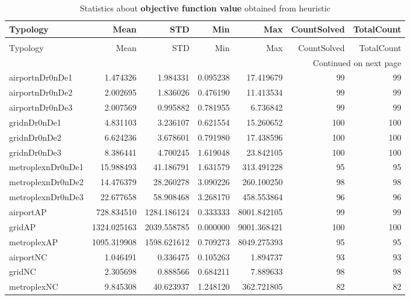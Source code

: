 
\begin{longtable}{|l|r|r|r|r|r|r|}
\caption{Statistics about \textbf{objective function value} obtained from heuristic} \label{table:heuristic:results} \\ \hline

Typology & Mean & STD & Min & Max & CountSolved & TotalCount \\ \hline

\endfirsthead
\caption[]{Statistics about \textbf{objective function value} obtained from heuristic} \\ \hline

Typology & Mean & STD & Min & Max & CountSolved & TotalCount \\ \hline

\endhead

\multicolumn{7}{r}{Continued on next page} \\ \hline

\endfoot

\endlastfoot
airportnDr0nDe1 & 1.474326 & 1.984331 & 0.095238 & 17.419679 & 99 & 99 \\ \hline
airportnDr0nDe2 & 2.002695 & 1.836026 & 0.476190 & 11.413534 & 99 & 99 \\ \hline
airportnDr0nDe3 & 2.007569 & 0.995882 & 0.781955 & 6.736842 & 99 & 99 \\ \hline
gridnDr0nDe1 & 4.831103 & 3.236107 & 0.621554 & 15.260652 & 100 & 100 \\ \hline
gridnDr0nDe2 & 6.624236 & 3.678601 & 0.791980 & 17.438596 & 100 & 100 \\ \hline
gridnDr0nDe3 & 8.386441 & 4.700245 & 1.619048 & 23.842105 & 100 & 100 \\ \hline
metroplexnDr0nDe1 & 15.988493 & 41.186791 & 1.631579 & 313.491228 & 95 & 95 \\ \hline
metroplexnDr0nDe2 & 14.476379 & 28.260278 & 3.090226 & 260.100250 & 98 & 98 \\ \hline
metroplexnDr0nDe3 & 22.677658 & 58.908468 & 3.268170 & 458.553864 & 96 & 96 \\ \hline
airportAP & 728.834510 & 1284.186124 & 0.333333 & 8001.842105 & 99 & 99 \\ \hline
gridAP & 1324.025163 & 2039.558785 & 0.000000 & 9001.368421 & 100 & 100 \\ \hline
metroplexAP & 1095.319908 & 1598.621612 & 0.709273 & 8049.275393 & 95 & 95 \\ \hline
airportNC & 1.046491 & 0.336475 & 0.105263 & 1.894737 & 93 & 93 \\ \hline
gridNC & 2.305698 & 0.888566 & 0.684211 & 7.889633 & 98 & 98 \\ \hline
metroplexNC & 9.845308 & 40.623937 & 1.248120 & 362.721805 & 82 & 82 \\ \hline
\end{longtable}
